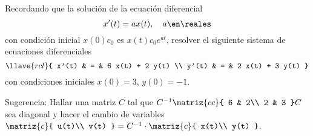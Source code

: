 \begin{enunciado}{\ejercicio}
  Recordando que la solución de la ecuación diferencial
  $$
    x'(t) = ax(t), \quad a \en \reales
  $$
  con condición inicial $x(0) c _0$ es $x(t)  c_0e^{at}$, resolver el siguiente sistema de ecuaciones diferenciales
  $$
    \llave{rcl}{
      x'(t) & = & 6 x(t) + 2 y(t) \\
      y'(t) & = & 2 x(t) + 3 y(t)
    }
  $$
  con condiciones iniciales $x(0) = 3$, $y(0)= -1$.

  \parbox{0.9\textwidth}{
    Sugerencia:
    Hallar una matriz $C$ tal que
    $C^{-1}
      \matriz{cc}{
        6 & 2\\
        2 & 3
      }
      C
    $
    sea diagonal y hacer el cambio de variables
    $
      \matriz{c}{
        u(t)\\
        v(t)
      }
      =
      C^{-1} \cdot
      \matriz{c}{
        x(t)\\
        y(t)
      }
    $.
  }
\end{enunciado}

